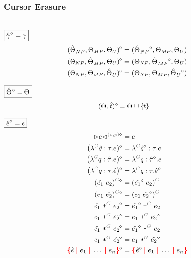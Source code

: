 
\subsubsection{Cursor Erasure}\hspace*{\fill} \\

\noindent $\boxed{\erase{\Z{\gamma}} = \gamma}$
%
\begin{align*}
  \erase{(\Z{\Set}_{NP}, \Set[MP], \Set[U])} &= (\erase{\Z{\Set}_{NP}}, \Set[MP], \Set[U]) \\
  \erase{(\Set[NP], \Z{\Set}_{MP}, \Set[U])} &= (\Set[NP], \erase{\Z{\Set}_{MP}}, \Set[U]) \\
  \erase{(\Set[NP], \Set[MP], \Z{\Set}_U)} &= (\Set[NP], \Set[MP], \erase{\Z{\Set}_U})
\end{align*}

\noindent $\boxed{\erase{\Z{\Set}} = \Set}$
%
\begin{align*}
  \erase{(\Set, \Z{t})} &= \Set \cup \SetOf{t}
\end{align*}

\noindent $\boxed{\erase{\Z{e}} = e}$
%
\begin{align*}
  \erase{\cursor{v}{p}{e}} &= e \\
  \erase{\left(\eFun{G}{\Z{q}}{\tau}{e}\right)} &= \eFun{G}{\erase{\Z{q}}}{\tau}{e} \\
  \erase{\left(\eFun{G}{q}{\Z{\tau}}{e}\right)} &= \eFun{G}{q}{\erase{\Z{\tau}}}{e} \\
  \erase{\left(\eFun{G}{q}{\tau}{\Z{e}}\right)} &= \eFun{G}{q}{\tau}{\erase{\Z{e}}} \\
  \erase{\eApp{G}{\Z{e_1}}{e_2}} &= \eApp{G}{\erase{\Z{e_1}}}{e_2} \\
  \erase{\eApp{G}{e_1}{\Z{e_2}}} &= \eApp{G}{e_1}{\erase{\Z{e_2}}} \\
  \erase{\ePlus{G}{\Z{e_1}}{e_2}} &= \ePlus{G}{\erase{\Z{e_1}}}{e_2} \\
  \erase{\ePlus{G}{e_1}{\Z{e_2}}} &= \ePlus{G}{e_1}{\erase{\Z{e_2}}} \\
  \erase{\eTimes{G}{\Z{e_1}}{e_2}} &= \eTimes{G}{\erase{\Z{e_1}}}{e_2} \\
  \erase{\eTimes{G}{e_1}{\Z{e_2}}} &= \eTimes{G}{e_1}{\erase{\Z{e_2}}} \\
  \erase{\conflictHole{\Z{e}, e_1, \ldots, e_n}} &= \conflictHole{\erase{\Z{e}}, e_1, \ldots, e_n}
\end{align*}


